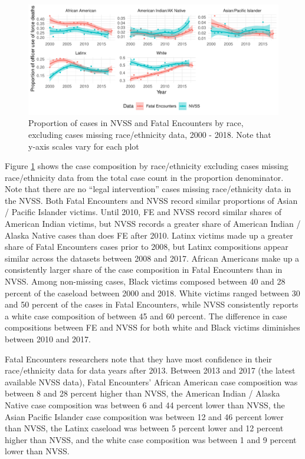 \documentclass{article}
\begin{document}
\begin{figure}
	\centering
	\includegraphics[width = \linewidth]{vis/fe_nvss_race_compare_na_rm.pdf}
	\caption{Proportion of cases in NVSS and Fatal Encounters by race, excluding cases missing race/ethnicity data, 2000 - 2018. Note that y-axis scales vary for each plot}
	\label{fig:compare_missing_na_rm}
\end{figure}

Figure \ref{fig:compare_missing_na_rm} shows the case composition by race/ethnicity excluding cases missing race/ethnicity data from the total case count in the proportion denominator. Note that there are no ``legal intervention'' cases missing race/ethnicity data in the NVSS. Both Fatal Encounters and NVSS record similar proportions of Asian / Pacific Islander victims. Until 2010, FE and NVSS record similar shares of American Indian victims, but NVSS records a greater share of American Indian / Alaska Native cases than does FE after 2010. Latinx victims made up a greater share of Fatal Encounters cases prior to 2008, but Latinx compositions appear similar across the datasets between 2008 and 2017. African Americans make up a consistently larger share of the case composition in Fatal Encounters than in NVSS. Among non-missing cases, Black victims composed between 40 and 28 percent of the caseload between 2000 and 2018. White victims ranged between 30 and 50 percent of the cases in Fatal Encounters, while NVSS consistently reports a white case composition of between 45 and 60 percent. The difference in case compositions between FE and NVSS for both white and Black victims diminishes between 2010 and 2017.

Fatal Encounters researchers note that they have most confidence in their race/ethnicity data for data years after 2013. Between 2013 and 2017 (the latest available NVSS data), Fatal Encounters' African American case composition was between 8 and 28 percent higher than NVSS, the American Indian / Alaska Native case composition was between 6 and 44 percent lower than NVSS, the Asian Pacific Islander case composition was between 12 and 46 percent lower than NVSS, the Latinx caseload was between 5 percent lower and 12 percent higher than NVSS, and the white case composition was between 1 and 9 percent lower than NVSS. 
\end{document}
